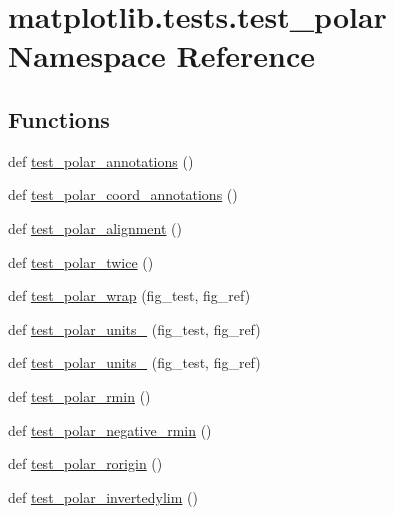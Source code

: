 \hypertarget{namespacematplotlib_1_1tests_1_1test__polar}{}\section{matplotlib.\+tests.\+test\+\_\+polar Namespace Reference}
\label{namespacematplotlib_1_1tests_1_1test__polar}
\subsection*{Functions}
\begin{DoxyCompactItemize}
\item 
def \hyperlink{namespacematplotlib_1_1tests_1_1test__polar_a881c780d9990c8f24eafe11145549875}{test\+\_\+polar\+\_\+annotations} ()
\item 
def \hyperlink{namespacematplotlib_1_1tests_1_1test__polar_adbb83ec99cf759443204e1194b8ab6e9}{test\+\_\+polar\+\_\+coord\+\_\+annotations} ()
\item 
def \hyperlink{namespacematplotlib_1_1tests_1_1test__polar_acde6f5fd93900b33f358b2934ae96555}{test\+\_\+polar\+\_\+alignment} ()
\item 
def \hyperlink{namespacematplotlib_1_1tests_1_1test__polar_a98405a79436280a1e77d4cb36c8f663c}{test\+\_\+polar\+\_\+twice} ()
\item 
def \hyperlink{namespacematplotlib_1_1tests_1_1test__polar_a90c1757c3935ed65702f2a3113ca331b}{test\+\_\+polar\+\_\+wrap} (fig\+\_\+test, fig\+\_\+ref)
\item 
def \hyperlink{namespacematplotlib_1_1tests_1_1test__polar_a6cd890e8e4e9873160ebbdeb74268103}{test\+\_\+polar\+\_\+units\+\_} (fig\+\_\+test, fig\+\_\+ref)
\item 
def \hyperlink{namespacematplotlib_1_1tests_1_1test__polar_ae1265ab5ecf7da3938bd670f603ab544}{test\+\_\+polar\+\_\+units\+\_} (fig\+\_\+test, fig\+\_\+ref)
\item 
def \hyperlink{namespacematplotlib_1_1tests_1_1test__polar_ae577c7085791c7279bfebfa49e00d713}{test\+\_\+polar\+\_\+rmin} ()
\item 
def \hyperlink{namespacematplotlib_1_1tests_1_1test__polar_a68e551ed5ddcb52bb514140c03109384}{test\+\_\+polar\+\_\+negative\+\_\+rmin} ()
\item 
def \hyperlink{namespacematplotlib_1_1tests_1_1test__polar_a2c6a1bcf6ec0039f972b2b0263633341}{test\+\_\+polar\+\_\+rorigin} ()
\item 
def \hyperlink{namespacematplotlib_1_1tests_1_1test__polar_a5d320c55ea9f48ac354dc58f136e23fb}{test\+\_\+polar\+\_\+invertedylim} ()

\end{DoxyCompactItemize}

